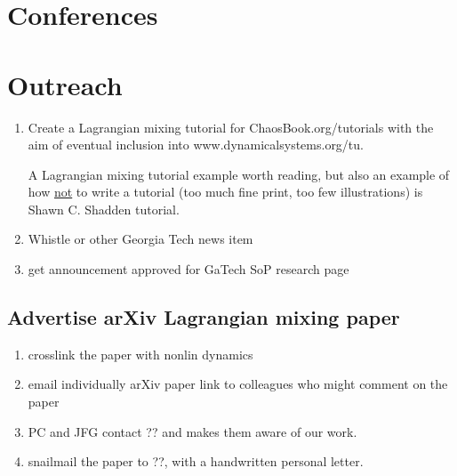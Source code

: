 \section{Conferences}

\section{Outreach}

\begin{enumerate}
\item
Create a Lagrangian mixing tutorial for
     {ChaosBook.org/tutorials}
with the aim of eventual inclusion into
     {www.dynamicalsystems.org/tu}.

A Lagrangian mixing tutorial example worth reading,
but also an example of how \underline{not}
to write a tutorial (too much fine print, too few illustrations) is
     {Shawn C. Shadden} tutorial.

\item
Whistle or other Georgia Tech news item

\item
get announcement approved for GaTech SoP research page

\end{enumerate}

\subsection{Advertise arXiv Lagrangian mixing paper}

\begin{enumerate}
\item
crosslink the paper with nonlin dynamics

\item
email individually arXiv paper link to colleagues who might comment
    on the paper

\item
PC and JFG contact ?? and makes them aware of our work.

\item
snailmail the paper to ??, with a handwritten personal letter.

\end{enumerate}
